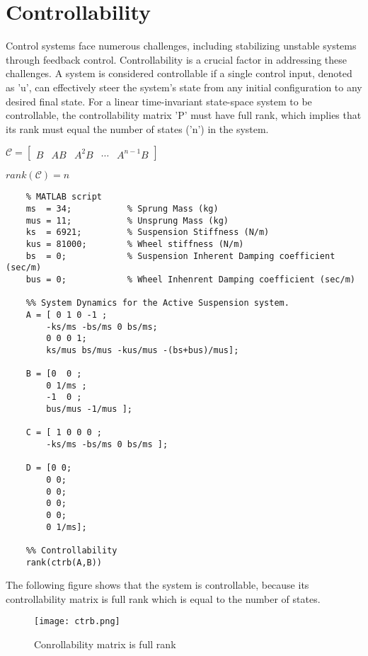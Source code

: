\section{Controllability}
Control systems face numerous challenges, including stabilizing unstable systems through feedback control. Controllability is a crucial factor in addressing these challenges. A system is considered controllable if a single control input, denoted as 'u', can effectively steer the system's state from any initial configuration to any desired final state. For a linear time-invariant state-space system to be controllable, the controllability matrix 'P' must have full rank, which implies that its rank must equal the number of states ('n') in the system.\newline

$\mathcal{C} = \left[ \begin{matrix}
	B & AB & A^2B & \cdots & A^{n-1}B
\end{matrix} \right]$

$rank(\mathcal{C}) = n$


\begin{verbatim}
	% MATLAB script
	ms  = 34;           % Sprung Mass (kg)
	mus = 11;           % Unsprung Mass (kg)
	ks  = 6921;         % Suspension Stiffness (N/m)
	kus = 81000;        % Wheel stiffness (N/m)
	bs  = 0;            % Suspension Inherent Damping coefficient (sec/m)
	bus = 0;            % Wheel Inhenrent Damping coefficient (sec/m)
	
	%% System Dynamics for the Active Suspension system.
	A = [ 0 1 0 -1 ;
		-ks/ms -bs/ms 0 bs/ms;
		0 0 0 1; 
		ks/mus bs/mus -kus/mus -(bs+bus)/mus];
	
	B = [0  0 ; 
		0 1/ms ; 
		-1  0 ;
		bus/mus -1/mus ];
		
	C = [ 1 0 0 0 ; 
		-ks/ms -bs/ms 0 bs/ms ];
	
	D = [0 0;
		0 0;
		0 0;
		0 0;
		0 0;
		0 1/ms];
	
	%% Controllability
	rank(ctrb(A,B))
\end{verbatim}

\newpage
The following figure shows that the system is controllable, because its controllability matrix is full rank which is equal to the number of states.

\begin{figure}[H]
	\centering
	\texttt{[image: ctrb.png]}
	\caption{Conrollability matrix is full rank}
	\label{fig:ctrb}	
\end{figure}


